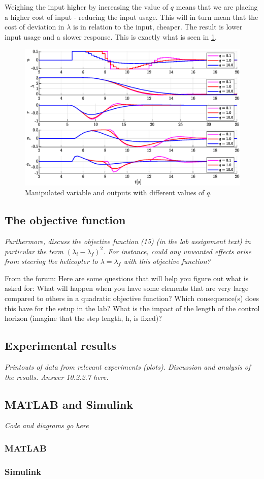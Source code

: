 \documentclass[../main.tex]{subfiles}
\begin{document}
Weighing the input higher by increasing the value of $q$ means that we are placing a higher cost of input - reducing the input usage. This will in turn mean that the cost of deviation in $\lambda$ is in relation to the input, cheaper. The result is lower input usage and a slower response. This is exactly what is seen in \cref{fig:lab2optimalu}.

\begin{figure}[h]
	\centering
	\includegraphics[width=\linewidth]{figures/lab2_optimal_u}
	\caption{Manipulated variable and outputs with different values of $q$.}
	\label{fig:lab2optimalu}
\end{figure}

\subsection{The objective function}
\textit{Furthermore, discuss the objective function (15) (in the lab assignment text) in particular the term $(\lambda_i-\lambda_f )^2$. For instance, could any unwanted effects arise from steering the helicopter to $\lambda =\lambda_f$ with this objective function?}

From the forum: Here are some questions that will help you figure out what is asked for:
What will happen when you have some elements that are very large compared to others in a quadratic objective function? Which consequence(s) does this have for the setup in the lab? What is the impact of the length of the control horizon (imagine that the step length, h, is fixed)?

\subsection{Experimental results}
\textit{Printouts of data from relevant experiments (plots).
Discussion and analysis of the results.
Answer 10.2.2.7 here.}

\subsection{MATLAB and Simulink}
\textit{Code and diagrams go here}
\subsubsection{MATLAB}

\subsubsection{Simulink}
\end{document}
